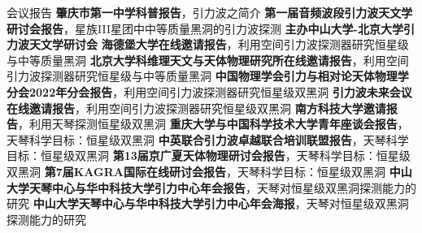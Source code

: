 
\begin{rubric}{会议报告}
	\entry*[2024] \textbf{肇庆市第一中学科普报告}，引力波之简介
    \entry*[2024] \textbf{第一届音频波段引力波天文学研讨会报告}，星族III星团中中等质量黑洞的引力波探测
	\entry*[2023] \textbf{主办中山大学-北京大学引力波天文学研讨会}
	\entry*[2023] \textbf{海德堡大学在线邀请报告}，利用空间引力波探测器研究恒星级与中等质量黑洞
	\entry*[2023] \textbf{北京大学科维理天文与天体物理研究所在线邀请报告}，利用空间引力波探测器研究恒星级与中等质量黑洞
	\entry*[2022] \textbf{中国物理学会引力与相对论天体物理学分会2022年分会报告}，利用空间引力波探测器研究恒星级双黑洞
	\entry*[2022] \textbf{引力波未来会议在线邀请报告}，利用空间引力波探测器研究恒星级双黑洞
	\entry*[2022] \textbf{南方科技大学邀请报告}，利用天琴探测恒星级双黑洞
	\entry*[2021] \textbf{重庆大学与中国科学技术大学青年座谈会报告}，天琴科学目标：恒星级双黑洞
	\entry*[2021] \textbf{中英联合引力波卓越联合培训联盟报告}，天琴科学目标：恒星级双黑洞
	\entry*[2020] \textbf{第13届京广夏天体物理研讨会报告}，天琴科学目标：恒星级双黑洞
	\entry*[2020] \textbf{第7届KAGRA国际在线研讨会报告}，天琴科学目标：恒星级双黑洞
	\entry*[2019] \textbf{中山大学天琴中心与华中科技大学引力中心年会报告}，天琴对恒星级双黑洞探测能力的研究
	\entry*[2018] \textbf{中山大学天琴中心与华中科技大学引力中心年会海报}，天琴对恒星级双黑洞探测能力的研究
\end{rubric}
